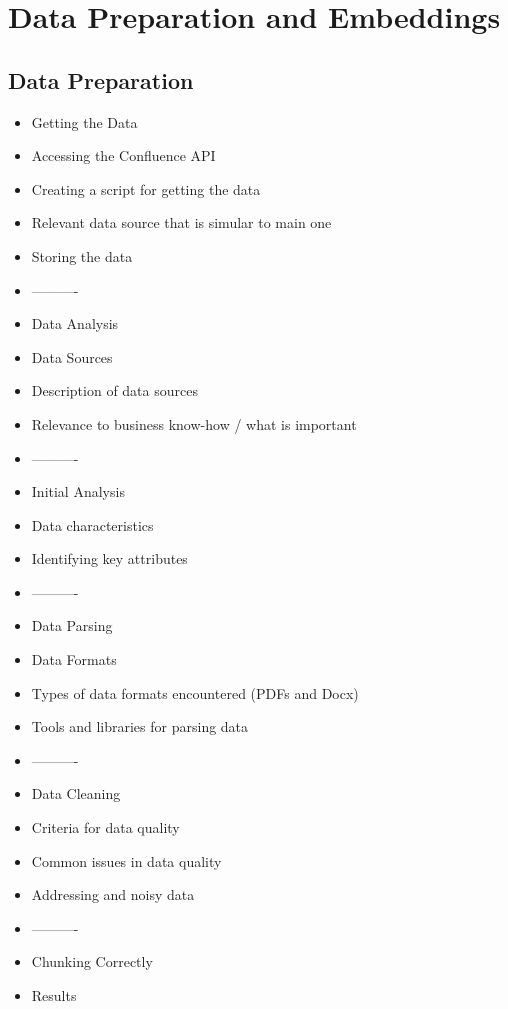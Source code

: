 \chapter{Data Preparation and Embeddings}
\section{Data Preparation}
\begin{itemize}
    \item Getting the Data
    \item Accessing the Confluence API
    \item Creating a script for getting the data
    \item Relevant data source that is simular to main one
    \item Storing the data
    \item ----------
    \item Data Analysis
    \item Data Sources
    \item Description of data sources
    \item Relevance to business know-how / what is important
    \item ----------
    \item Initial Analysis
    \item Data characteristics
    \item Identifying key attributes
    \item ----------
    \item Data Parsing
    \item Data Formats
    \item Types of data formats encountered  (PDFs and Docx)
    \item Tools and libraries for parsing data
    \item ----------
    \item Data Cleaning
    \item Criteria for data quality
    \item Common issues in data quality
    \item Addressing and noisy data
    \item ----------
    \item Chunking Correctly
    \item Results
\end{itemize}

